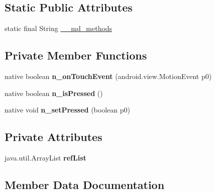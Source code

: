 \subsection*{Static Public Attributes}
\begin{DoxyCompactItemize}
\item 
static final String \hyperlink{classmd5b60ffeb829f638581ab2bb9b1a7f4f3f_1_1FormsSeekBar_a7c8d57a3b8d9e0664dc0d6410af2b631}{\+\_\+\+\_\+md\+\_\+methods}
\end{DoxyCompactItemize}
\subsection*{Private Member Functions}
\begin{DoxyCompactItemize}
\item 
\mbox{\label{classmd5b60ffeb829f638581ab2bb9b1a7f4f3f_1_1FormsSeekBar_aa4dc7163026ee545dc2829db5cacddcb}} 
native boolean {\bfseries n\+\_\+on\+Touch\+Event} (android.\+view.\+Motion\+Event p0)
\item 
\mbox{\label{classmd5b60ffeb829f638581ab2bb9b1a7f4f3f_1_1FormsSeekBar_ad159f91f4c3d0cea0cd6d22b1ca45870}} 
native boolean {\bfseries n\+\_\+is\+Pressed} ()
\item 
\mbox{\label{classmd5b60ffeb829f638581ab2bb9b1a7f4f3f_1_1FormsSeekBar_a43c91a743f795b460a3a27e8690d828a}} 
native void {\bfseries n\+\_\+set\+Pressed} (boolean p0)
\end{DoxyCompactItemize}
\subsection*{Private Attributes}
\begin{DoxyCompactItemize}
\item 
\mbox{\label{classmd5b60ffeb829f638581ab2bb9b1a7f4f3f_1_1FormsSeekBar_a6ddd1f5719fb4c93d3a92c0d6b9a6694}} 
java.\+util.\+Array\+List {\bfseries ref\+List}
\end{DoxyCompactItemize}


\subsection{Member Data Documentation}
\mbox{\label{classmd5b60ffeb829f638581ab2bb9b1a7f4f3f_1_1FormsSeekBar_a7c8d57a3b8d9e0664dc0d6410af2b631}} 
